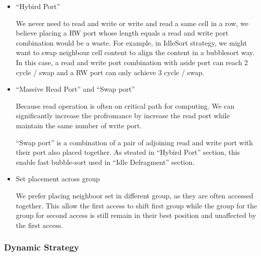 \documentclass[11pt]{article}
\begin{document}
\begin{itemize}
\item ``Hybird Port''

We never need to read and write or write and read a same cell in a row, we believe placing a RW port whose length equals a read and write port combination would be a waste. For example, in IdleSort strategy, we might want to swap neighbour cell content to align the content in a bubblesort way. In this case, a read and write port combination with aside port can reach 2 cycle / swap and a RW port can only achieve 3 cycle / swap.

\item ``Massive Read Port'' and ``Swap port''

Because read operation is often on critical path for computing. We can significantly increase the profromance by increase the read port while maintain the same number of write port.

``Swap port'' is a combination of a pair of adjoining read and write port with their port also placed together. As steated in ``Hybird Port'' section, this enable fast bubble-sort used in ``Idle Defragment'' section.

\item Set placement across group

We prefer placing neighboor set in different group, as they are often accessed together. This allow the first access to shift first group while the group for the group for second access is still remain in their best position and unaffected by the first access.

\end{itemize}

\subsubsection{Dynamic Strategy}
\end{document}
